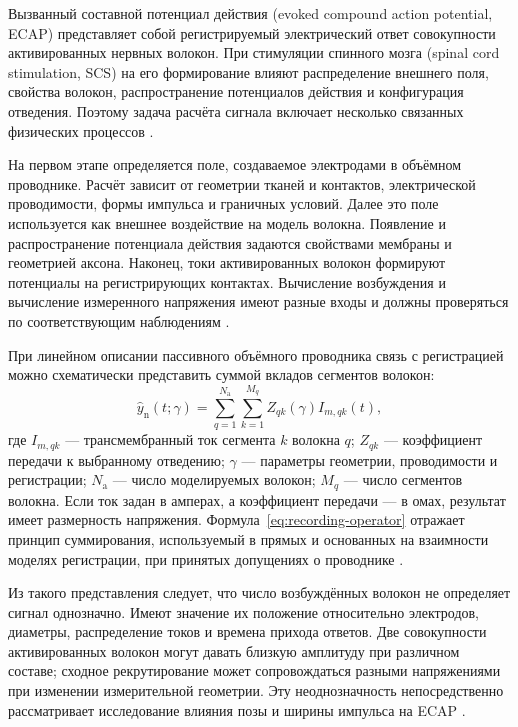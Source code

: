 Вызванный составной потенциал действия (evoked compound action potential, ECAP) представляет собой регистрируемый электрический ответ совокупности активированных нервных волокон. При стимуляции спинного мозга (spinal cord stimulation, SCS) на его формирование влияют распределение внешнего поля, свойства волокон, распространение потенциалов действия и конфигурация отведения. Поэтому задача расчёта сигнала включает несколько связанных физических процессов \cite{ecapmodel,s285}.

На первом этапе определяется поле, создаваемое электродами в объёмном проводнике. Расчёт зависит от геометрии тканей и контактов, электрической проводимости, формы импульса и граничных условий. Далее это поле используется как внешнее воздействие на модель волокна. Появление и распространение потенциала действия задаются свойствами мембраны и геометрией аксона. Наконец, токи активированных волокон формируют потенциалы на регистрирующих контактах. Вычисление возбуждения и вычисление измеренного напряжения имеют разные входы и должны проверяться по соответствующим наблюдениям \cite{ecapmodel,posture}.

При линейном описании пассивного объёмного проводника связь с регистрацией можно схематически представить суммой вкладов сегментов волокон:
\begin{equation}
 \widehat y_{\mathrm n}(t;\gamma)=
 \sum_{q=1}^{N_{\mathrm a}}\sum_{k=1}^{M_q}
 Z_{qk}(\gamma) I_{m,qk}(t),
 \label{eq:recording-operator}
\end{equation}
где $I_{m,qk}$ --- трансмембранный ток сегмента $k$ волокна $q$; $Z_{qk}$ --- коэффициент передачи к выбранному отведению; $\gamma$ --- параметры геометрии, проводимости и регистрации; $N_{\mathrm a}$ --- число моделируемых волокон; $M_q$ --- число сегментов волокна. Если ток задан в амперах, а коэффициент передачи --- в омах, результат имеет размерность напряжения. Формула~\eqref{eq:recording-operator} отражает принцип суммирования, используемый в прямых и основанных на взаимности моделях регистрации, при принятых допущениях о проводнике \cite{ecapmodel,posture}.

Из такого представления следует, что число возбуждённых волокон не определяет сигнал однозначно. Имеют значение их положение относительно электродов, диаметры, распределение токов и времена прихода ответов. Две совокупности активированных волокон могут давать близкую амплитуду при различном составе; сходное рекрутирование может сопровождаться разными напряжениями при изменении измерительной геометрии. Эту неоднозначность непосредственно рассматривает исследование влияния позы и ширины импульса на ECAP \cite{posture}.

